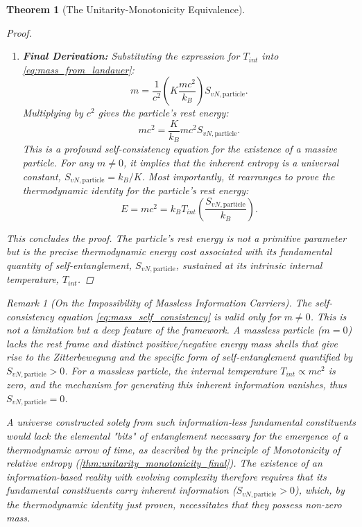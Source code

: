 \documentclass[11pt, letterpaper]{report}
\theoremstyle{plain} %
\newtheorem{theorem}{Theorem}[chapter]
\theoremstyle{definition} %
\theoremstyle{remark} %
\newtheorem{remark}{Remark}[chapter]
\begin{document}
\begin{theorem}[The Unitarity-Monotonicity Equivalence]
\begin{proof}
\begin{enumerate}
    \item \textbf{Final Derivation:} Substituting the expression for $T_{int}$ into \cref{eq:mass_from_landauer}:
    \begin{equation}
        m = \frac{1}{c^2} \left( K \frac{mc^2}{k_B} \right) S_{vN, \text{particle}}.
    \end{equation}
    Multiplying by $c^2$ gives the particle's rest energy:
    \begin{equation}
        mc^2 = \frac{K}{k_B} mc^2 S_{vN, \text{particle}}.
        \label{eq:mass_self_consistency}
    \end{equation}
    This is a profound self-consistency equation for the existence of a massive particle. For any $m \neq 0$, it implies that the inherent entropy is a universal constant, $S_{vN, \text{particle}} = k_B/K$. Most importantly, it rearranges to prove the thermodynamic identity for the particle's rest energy:
    \begin{equation}
        E = mc^2 = k_B T_{int} \left( \frac{S_{vN, \text{particle}}}{k_B} \right).
    \end{equation}
\end{enumerate}
This concludes the proof. The particle's rest energy is not a primitive parameter but is the precise thermodynamic energy cost associated with its fundamental quantity of self-entanglement, $S_{vN, \text{particle}}$, sustained at its intrinsic internal temperature, $T_{int}$.
\end{proof}

\begin{remark}[On the Impossibility of Massless Information Carriers]
\label{remark:no_massless_info}
The self-consistency equation \cref{eq:mass_self_consistency} is valid only for $m \neq 0$. This is not a limitation but a deep feature of the framework. A massless particle ($m=0$) lacks the rest frame and distinct positive/negative energy mass shells that give rise to the Zitterbewegung and the specific form of self-entanglement quantified by $S_{vN, \text{particle}}>0$. For a massless particle, the internal temperature $T_{int} \propto mc^2$ is zero, and the mechanism for generating this inherent information vanishes, thus $S_{vN, \text{particle}} = 0$.

A universe constructed solely from such information-less fundamental constituents would lack the elemental "bits" of entanglement necessary for the emergence of a thermodynamic arrow of time, as described by the principle of Monotonicity of relative entropy (\cref{thm:unitarity_monotonicity_final}). The existence of an information-based reality with evolving complexity therefore requires that its fundamental constituents carry inherent information ($S_{vN, \text{particle}} > 0$), which, by the thermodynamic identity just proven, necessitates that they possess non-zero mass.
\end{remark}












\end{theorem}
\end{document}
